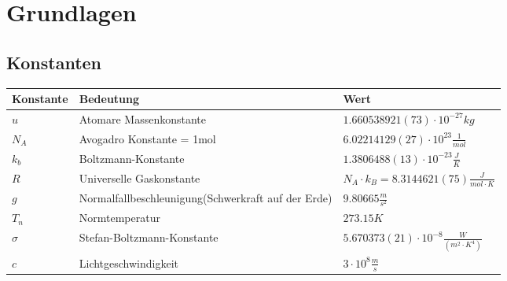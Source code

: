 \section{Grundlagen}
\subsection{Konstanten}
\begin{tabbing}
	\begin{tabu} to \linewidth {l X l }
		\toprule
		Konstante & Bedeutung & Wert \\
		\midrule
		$u$ & Atomare Massenkonstante & $1.660538921(73) \cdot 10^{-27} kg$\\
		$N_A$ & Avogadro Konstante = 1mol & $6.022141 29 (27) \cdot 10^{23} \frac{1}{mol}$  \\
		$k_b$ & Boltzmann-Konstante & $1.3806488(13) \cdot 10^{-23}\frac{J}{K}$  \\
		$R$ & Universelle Gaskonstante & $N_A \cdot k_B = 8.3144621 (75) \frac{J}{mol \cdot K}$ \\
		$g$ & Normalfallbeschleunigung(Schwerkraft auf der Erde) & $9.80665\frac{m}{s^2}$ \\
		$T_n$ & Normtemperatur & $273.15K$  \\
		$\sigma$ & Stefan-Boltzmann-Konstante & $5.670373(21) \cdot 10^{-8} \frac{W}{(m^2 \cdot K^4)}$  \\
		$c$ & Lichtgeschwindigkeit & $3 \cdot 10^8 \frac{m}{s}$  \\
	\end{tabu}
\end{tabbing}

